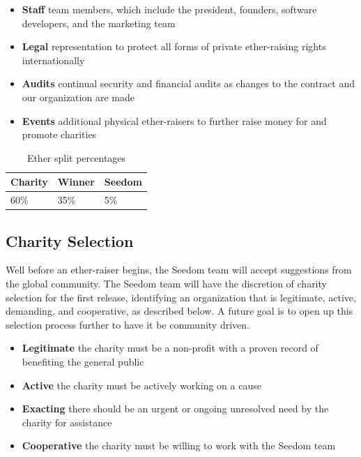 \documentclass[11pt]{article}
\begin{document}
\begin{itemize}
\item{\textbf{Staff} team members, which include the president, founders, software developers, and the marketing team}
\item{\textbf{Legal} representation to protect all forms of private ether-raising rights internationally}
\item{\textbf{Audits} continual security and financial audits as changes to the contract and our organization are made}
\item{\textbf{Events} additional physical ether-raisers to further raise money for and promote charities}
\end{itemize}

\begin{table}[H]
\begin{center}
\begin{tabular}{| l | l | l |}
\hline
\textbf{Charity} & \textbf{Winner} & \textbf{Seedom} \\ \hline
60\% & 35\%  & 5\% \\ \hline
\end{tabular}
\caption{Ether split percentages}
\label{tab:etherSplitPercentages}
\end{center}
\end{table}

\subsection{Charity Selection}

Well before an ether-raiser begins, the Seedom team will accept suggestions from the global community. The Seedom team will have the discretion of charity selection for the first release, identifying an organization that is legitimate, active, demanding, and cooperative, as described below. A future goal is to open up this selection process further to have it be community driven.

\begin{itemize}
\item{\textbf{Legitimate} the charity must be a non-profit with a proven record of benefiting the general public}
\item{\textbf{Active} the charity must be actively working on a cause}
\item{\textbf{Exacting} there should be an urgent or ongoing unresolved need by the charity for assistance}
\item{\textbf{Cooperative} the charity must be willing to work with the Seedom team}
\end{itemize}
\end{document}
